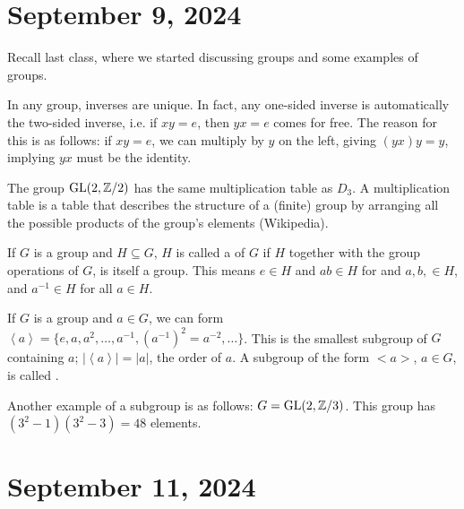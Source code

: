 \documentclass[12pt]{scrartcl}
\begin{document}
\section{September 9, 2024}
Recall last class, where we started discussing groups and some examples of groups.

\begin{remark}
    In any group, inverses are unique. In fact, any one-sided inverse is automatically the two-sided inverse, i.e. if $xy=e$, then $yx = e$ comes for free. The reason for this is as follows: if $xy = e$, we can multiply by $y$ on the left, giving $(yx)y = y$, implying $yx$ must be the identity.
\end{remark}

\begin{remark}
    The group $\text{GL}(2, \mathbb Z / 2)$ has the same multiplication table as $D_3$. A multiplication table is a table that describes the structure of a (finite) group by arranging all the possible products of the group's elements (Wikipedia).
\end{remark}

\begin{definition}
    If $G$ is a group and $H \subseteq G$, $H$ is called a  of $G$ if $H$ together with the group operations of $G$, is itself a group. This means $e \in H$ and $ab \in H$ for and $a, b, \in H$, and $a^{-1} \in H$ for all $a \in H$.
\end{definition}

\begin{remark}
    If $G$ is a group and $a \in G$, we can form $\left<a\right> = \{e, a, a^2, \ldots, a^{-1}, (a^{-1})^2 = a^{-2}, \ldots\}$. This is the smallest subgroup of $G$ containing $a$; $|\left<a\right>| = |a|$, the order of $a$. A subgroup of the form $<a>$, $a \in G$, is called .
\end{remark}

\begin{example}
    Another example of a subgroup is as follows: $G = \text{GL}(2, \mathbb Z / 3)$. This group has $(3^2-1)(3^2-3) = 48$ elements.
\end{example}

\section{September 11, 2024}
\end{document}
